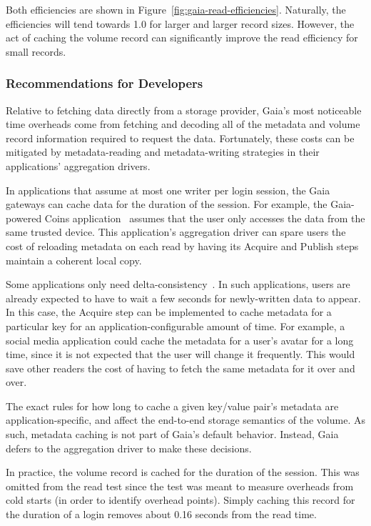 Both efficiencies are shown in Figure~\ref{fig:gaia-read-efficiencies}.  Naturally,
the efficiencies will tend towards 1.0 for larger and larger record sizes.
However, the act of caching the volume record can significantly improve the read
efficiency for small records.

\subsubsection{Recommendations for Developers}

Relative to fetching data directly from a storage provider, Gaia's most
noticeable time overheads come from fetching and decoding all of the metadata
and volume record information required to request the data.
Fortunately, these costs can be
mitigated by metadata-reading and metadata-writing strategies in
their applications' aggregation drivers.

\hfill \break
{}
\hfill \break

In applications that assume at most one writer per login session,
the Gaia gateways can cache data for the duration of the session.
For example, the Gaia-powered Coins application~\cite{coins} assumes that the
user only accesses the data from the same trusted device.  This application's
aggregation driver can
spare users the cost of reloading metadata on each read by having its Acquire
and Publish steps maintain a coherent local copy.

Some applications only need delta-consistency~\cite{delta-consistency}.  In such
applications, users are already expected to have to wait a few seconds for newly-written data to
appear.  In this case, the Acquire step can be implemented to cache metadata for
a particular key for an application-configurable amount of time.  For example, a
social media application could cache the metadata for a user's avatar for a long
time, since it is not expected that the user will change it frequently.  This
would save other readers the cost of having to fetch the same metadata for it 
over and over.

The exact rules for how long to cache a given key/value pair's metadata are
application-specific, and affect the end-to-end storage semantics of the volume.
As such, metadata caching is not part of Gaia's default
behavior.  Instead, Gaia defers to the aggregation driver to make these
decisions.

In practice, the volume record is cached for the duration of the session.  This
was omitted from the read test since the test was meant to
measure overheads from cold starts (in order to identify overhead points).
Simply caching this record for the duration
of a login removes about 0.16 seconds from the read time.

